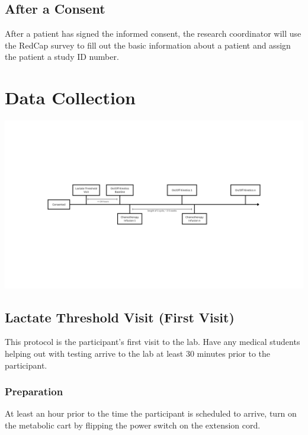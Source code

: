 \documentclass[
]{book}
\begin{document}
\hypertarget{after-a-consent}{%
\section{After a Consent}\label{after-a-consent}}

After a patient has signed the informed consent, the research coordinator will use the RedCap survey to fill out the basic information about a patient and assign the patient a study ID number.

\hypertarget{DataCollection}{%
\chapter{Data Collection}\label{DataCollection}}

\includegraphics[width=26.67in]{images/visit_timeline}

\hypertarget{Methods-LT}{%
\section{Lactate Threshold Visit (First Visit)}\label{Methods-LT}}

This protocol is the participant's first visit to the lab. Have any medical students helping out with testing arrive to the lab at least 30 minutes prior to the participant.

\hypertarget{Methods-LT-prep}{%
\subsection{Preparation}\label{Methods-LT-prep}}

At least an hour prior to the time the participant is scheduled to arrive, turn on the metabolic cart by flipping the power switch on the extension cord.
\end{document}
